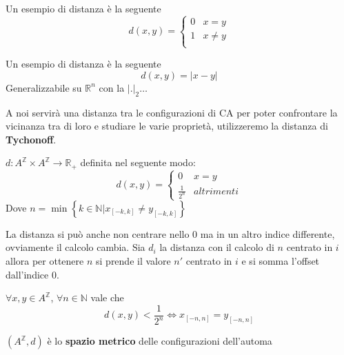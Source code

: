 \begin{esempio}
    Un esempio di distanza è la seguente
    $$d(x,y) =\begin{cases}
            0 & x=y    \\
            1 & x\ne y \\
        \end{cases}$$
\end{esempio}

\begin{esempio}
    Un esempio di distanza è la seguente
    $$d(x,y) =|x-y|$$
    Generalizzabile su $\mathbb{R}^n$ con la $|.|_2$$\dots$
\end{esempio}

A noi servirà una distanza tra le configurazioni di CA per poter confrontare
la vicinanza tra di loro e studiare le varie proprietà, utilizzeremo la distanza di
\textbf{Tychonoff}.
\begin{definizione} 
    $d:A^\mathbb{Z}\times A^\mathbb{Z} \rightarrow \mathbb{R}_+$ definita nel
    seguente modo:
    $$d(x,y) = \begin{cases}
            0             & x=y        \\
            \frac{1}{2^n} & altrimenti
        \end{cases}$$
    Dove $n= \min\left\{k\in \mathbb{N} | x_{[-k,k]} \ne y_{[-k,k]}\right\}$
\end{definizione}

La distanza si può anche non centrare nello $0$ ma in un altro indice differente,
ovviamente il calcolo cambia. Sia $d_i$ la distanza con il calcolo di $n$ centrato
in $i$ allora per ottenere $n$ si prende il valore $n'$ centrato in $i$ e si somma
l'offset dall'indice $0$.

\begin{nota}  \label{prop:dist}
    $\forall x,y\in A^\mathbb{Z}$, $\forall n\in \mathbb{N}$ vale che
    $$d(x,y)< \frac{1}{2^n}\iff x_{[-n, n]}=y_{[-n, n]}$$
\end{nota}

\begin{definizione}
    $(A^\mathbb{Z}, d)$ è lo \textbf{spazio metrico} delle configurazioni dell'automa
\end{definizione}

